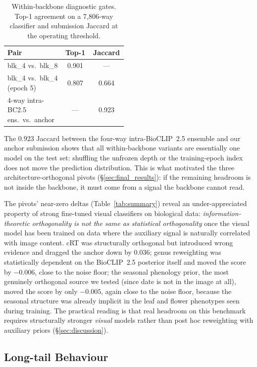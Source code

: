 \begin{table}[ht]
  \centering
  \small
  \setlength{\tabcolsep}{2pt}
  \begin{tabular}{@{}p{0.48\linewidth}cc@{}}
    \toprule
    Pair & Top-1 & Jaccard \\
    \midrule
    blk\_4 vs.\ blk\_8 & 0.901 & --- \\
    blk\_4 vs.\ blk\_4 (epoch 5) & 0.807 & 0.664 \\
    4-way intra-BC2.5 ens.\ vs.\ anchor & --- & 0.923 \\
    \bottomrule
  \end{tabular}
  \caption{Within-backbone diagnostic gates. Top-1 agreement on a 7{,}806-way classifier and submission Jaccard at the operating threshold.}
  \label{tab:within}
\end{table}

The $0.923$ Jaccard between the four-way intra-BioCLIP~2.5 ensemble and our anchor submission
shows that all within-backbone variants are essentially one model on the test set: shuffling the
unfrozen depth or the training-epoch index does not move the prediction distribution. This is
what motivated the three architecture-orthogonal pivots (\S\ref{sec:final_results}): if the
remaining headroom is not inside the backbone, it must come from a signal the backbone cannot
read.

The pivots' near-zero deltas (Table~\ref{tab:summary}) reveal an under-appreciated property of
strong fine-tuned visual classifiers on biological data: \emph{information-theoretic
orthogonality is not the same as statistical orthogonality} once the visual model has been
trained on data where the auxiliary signal is naturally correlated with image content. cRT was
structurally orthogonal but introduced wrong evidence and dragged the anchor down by $0.036$;
genus reweighting was statistically dependent on the BioCLIP~2.5 posterior itself and moved the
score by $-0.006$, close to the noise floor; the seasonal phenology prior, the most genuinely
orthogonal source we tested (since date is not in the image at all), moved the score by only
$-0.005$, again close to the noise floor, because the seasonal structure was already implicit in
the leaf and flower phenotypes seen during training. The practical reading is that real headroom
on this benchmark requires structurally stronger \emph{visual} models rather than post hoc
reweighting with auxiliary priors (\S\ref{sec:discussion}).

\subsection{Long-tail Behaviour}
\label{sec:longtail}

